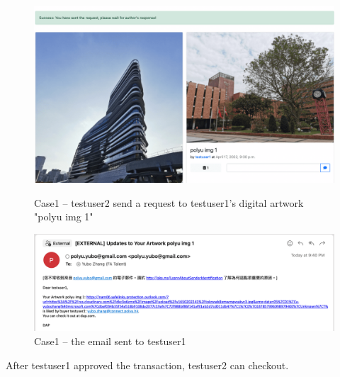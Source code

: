 \begin{figure}[h]
    \centering
    \begin{minipage}{.5\textwidth}
        \centering
        \includegraphics[width=\linewidth]{figures/case1-6.png}
        \caption{Case1 -- testuser2 send a request to testuser1's digital artwork "polyu img 1"}
        \label{fig: case1-5}
    \end{minipage}%
    \begin{minipage}{0.5\textwidth}
        \centering
        \includegraphics[width=\linewidth]{figures/case1-7.png}
        \caption{Case1 -- the email sent to testuser1}
        \label{fig: case1-6}
    \end{minipage}
\end{figure}

After testuser1 approved the transaction, testuser2 can checkout.

